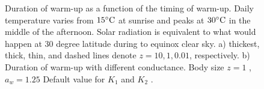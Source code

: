 %
\begin{figure}[H]
\begin{center}
\caption{
	Duration of warm-up as a function of the timing of warm-up.
	Daily temperature varies from $15^{\circ}\rm{C}$ at sunrise and peaks at $30^{\circ}\rm{C}$ in the middle of the afternoon.
	Solar radiation is equivalent to what would happen at 30 degree latitude during to equinox clear sky.
	a) thickest, thick, thin, and dashed lines denote  $z = 10, 1, 0.01$,  respectively.
	b)  Duration of warm-up with different conductance. Body size $z = 1$ , $a_w = 1.25$
	Default value for $K_1$ and $K_2$ .	
}%
\label{fig5}
\end{center}
\end{figure}
\vspace{-0.85 cm}
